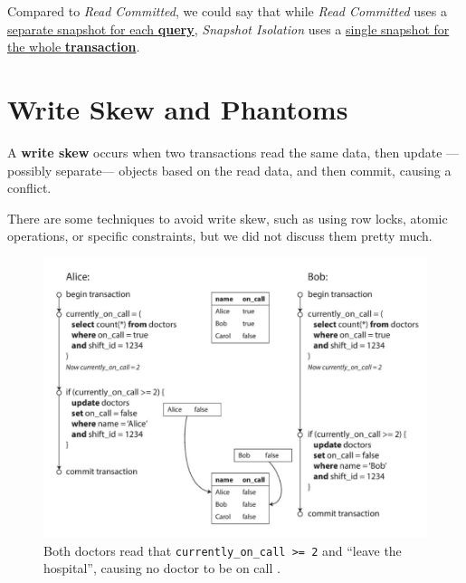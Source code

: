 Compared to \textit{Read Committed}, we could say that while \textit{Read Committed} uses a \ul{separate snapshot for each \textbf{query}}, \textit{Snapshot Isolation} uses a \ul{single snapshot for the whole \textbf{transaction}}.

\section{Write Skew and Phantoms}

\begin{paracol}{2}
  
   \colfill
   \begin{definition}
      A \textbf{write skew} occurs when two transactions read the same data, then update ---possibly separate--- objects based on the read data, and then commit, causing a conflict.
   \end{definition}
   There are some techniques to avoid write skew, such as using row locks, atomic operations, or specific constraints, but we did not discuss them pretty much.
   \colfill
   
   \switchcolumn

   \begin{figure}[htbp]
      \centering
      \includegraphics[width=0.9\columnwidth]{images/12/write_skew.png}
      \caption{Both doctors read that \lstinline|currently_on_call >= 2| and ``leave the hospital'', causing no doctor to be on call \frownie.}
      \label{fig:12/write_skew}
   \end{figure}
\end{paracol}



